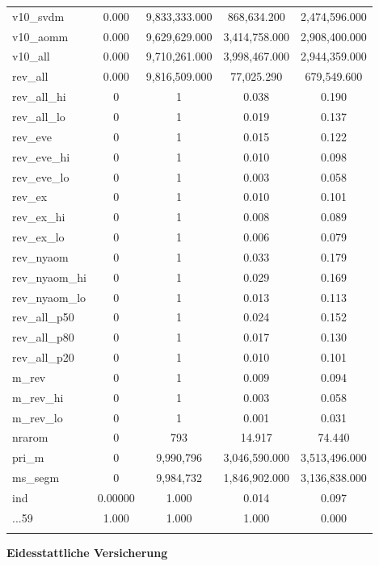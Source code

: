 \documentclass[11pt,]{article}
\begin{document}
\begin{table}[!htbp]
\begin{tabular}{@{\extracolsep{5pt}}lcccc}
v10\_svdm & 0.000 & 9,833,333.000 & 868,634.200 & 2,474,596.000 \\ 
v10\_aomm & 0.000 & 9,629,629.000 & 3,414,758.000 & 2,908,400.000 \\ 
v10\_all & 0.000 & 9,710,261.000 & 3,998,467.000 & 2,944,359.000 \\ 
rev\_all & 0.000 & 9,816,509.000 & 77,025.290 & 679,549.600 \\ 
rev\_all\_hi & 0 & 1 & 0.038 & 0.190 \\ 
rev\_all\_lo & 0 & 1 & 0.019 & 0.137 \\ 
rev\_eve & 0 & 1 & 0.015 & 0.122 \\ 
rev\_eve\_hi & 0 & 1 & 0.010 & 0.098 \\ 
rev\_eve\_lo & 0 & 1 & 0.003 & 0.058 \\ 
rev\_ex & 0 & 1 & 0.010 & 0.101 \\ 
rev\_ex\_hi & 0 & 1 & 0.008 & 0.089 \\ 
rev\_ex\_lo & 0 & 1 & 0.006 & 0.079 \\ 
rev\_nyaom & 0 & 1 & 0.033 & 0.179 \\ 
rev\_nyaom\_hi & 0 & 1 & 0.029 & 0.169 \\ 
rev\_nyaom\_lo & 0 & 1 & 0.013 & 0.113 \\ 
rev\_all\_p50 & 0 & 1 & 0.024 & 0.152 \\ 
rev\_all\_p80 & 0 & 1 & 0.017 & 0.130 \\ 
rev\_all\_p20 & 0 & 1 & 0.010 & 0.101 \\ 
m\_rev & 0 & 1 & 0.009 & 0.094 \\ 
m\_rev\_hi & 0 & 1 & 0.003 & 0.058 \\ 
m\_rev\_lo & 0 & 1 & 0.001 & 0.031 \\ 
nrarom & 0 & 793 & 14.917 & 74.440 \\ 
pri\_m & 0 & 9,990,796 & 3,046,590.000 & 3,513,496.000 \\ 
ms\_segm & 0 & 9,984,732 & 1,846,902.000 & 3,136,838.000 \\ 
ind & 0.00000 & 1.000 & 0.014 & 0.097 \\ 
...59 & 1.000 & 1.000 & 1.000 & 0.000 \\ 
\hline \\[-1.8ex] 
\end{tabular} 
\end{table}

\restoregeometry

\cleardoublepage

\newpage
\textbf{Eidesstattliche Versicherung}
\end{document}
